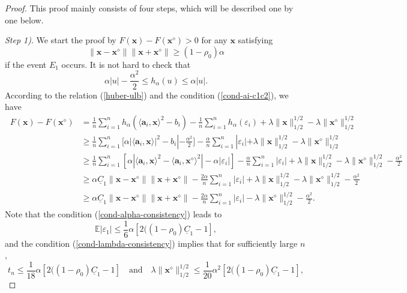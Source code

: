 \documentclass{article}
\numberwithin{equation}{section}
\begin{document}
\begin{proof}
 This proof mainly consists of four steps, which will be described one by one below. 

	
	\textit{Step 1)}. We start the proof by $F(\mathbf{x})-F(\mathbf{x}^\diamond)>0$ for any $\mathbf{x}$ satisfying $$\|\mathbf{x}-\mathbf{x}^\diamond\|\|\mathbf{x}+\mathbf{x}^\diamond\|\geq(1-\rho_0)\alpha$$ if the event $E_1$ occurs.
	It is not hard to check that \begin{equation}\label{huber-ulb}
		\alpha|u|-\frac{\alpha^2}{2}\leq	{h_{\alpha}(u)} \leq \alpha|u|.
	\end{equation}
	According to the relation (\ref{huber-ulb}) and the condition (\ref{cond-ai-c1c2}), we have
	\begin{equation}\label{Fx-lb}
		\begin{aligned}
			~F(\mathbf{x})-F(\mathbf{x}^\diamond)&=\frac{1}{n}\sum_{i=1}^nh_{\alpha}(\langle \mathbf{a}_i,\mathbf{x}\rangle^2-b_i)-\frac{1}{n}\sum_{i=1}^nh_{\alpha}(\varepsilon_i)+\lambda\|\mathbf{x}\|_{1/2}^{1/2}-\lambda\|\mathbf{x}^\diamond\|_{1/2}^{1/2}\\
			&\geq\frac{1}{n}\sum_{i=1}^n[\alpha|\langle \mathbf{a}_i,\mathbf{x}\rangle|^2-b_i|-\frac{\alpha^2}{2}]-\frac{\alpha}{n}\sum_{i=1}^n|\varepsilon_i|+\lambda\|\mathbf{x}\|_{1/2}^{1/2}-\lambda\|\mathbf{x}^\diamond\|_{1/2}^{1/2}\\
			&\geq\frac{1}{n}\sum_{i=1}^n[\alpha|\langle \mathbf{a}_i,\mathbf{x}\rangle^2-\langle \mathbf{a}_i,\mathbf{x}^\diamond\rangle^2|-\alpha|\varepsilon_i|]
			-\frac{\alpha}{n}\sum_{i=1}^n|\varepsilon_i|+\lambda\|\mathbf{x}\|_{1/2}^{1/2}-\lambda\|\mathbf{x}^\diamond\|_{1/2}^{1/2}-\frac{\alpha^2}{2}\\
			&\geq\alpha \underline{C}_1\|\mathbf{x}-\mathbf{x}^\diamond\|\|\mathbf{x}+\mathbf{x}^\diamond\|-\frac{2\alpha}{n}\sum_{i=1}^n|\varepsilon_i|+\lambda\|\mathbf{x}\|_{1/2}^{1/2}-\lambda\|\mathbf{x}^\diamond\|_{1/2}^{1/2}-\frac{\alpha^2}{2}\\	
			&\geq\alpha \underline{C}_1\|\mathbf{x}-\mathbf{x}^\diamond\|\|\mathbf{x}+\mathbf{x}^\diamond\|-\frac{2\alpha}{n}\sum_{i=1}^n|\varepsilon_i|-\lambda\|\mathbf{x}^\diamond\|_{1/2}^{1/2}-\frac{\alpha^2}{2}.			
		\end{aligned}
	\end{equation}
	Note that the condition (\ref{cond-alpha-consistency})  leads to
	$$\mathbb{E}|\varepsilon_1|\leq\frac{1}{6}\alpha[2((1-\rho_0)\underline{C}_1-1],$$
	and the condition (\ref{cond-lambda-consistency}) implies that for sufficiently large $n$, $$t_n\leq\frac{1}{18}\alpha[2((1-\rho_0)\underline{C}_1-1]\quad \mbox{and}\quad\lambda\|\mathbf{x}^\diamond\|_{1/2}^{1/2}\leq\frac{1}{20}\alpha^2[2((1-\rho_0)\underline{C}_1-1],$$

\end{proof}
\end{document}

